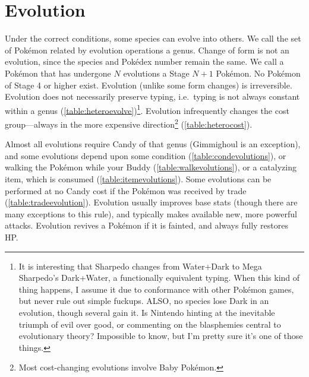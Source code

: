 \section{Evolution\label{sec:evolution}}
Under the correct conditions, some species can evolve into others.
We call the set of Pokémon related by evolution operations a genus.
Change of form is not an evolution, since the species and Pokédex number remain the same.
We call a Pokémon that has undergone $N$ evolutions a Stage $N+1$ Pokémon.
No Pokémon of Stage 4 or higher exist.
Evolution (unlike some form changes) is irreversible.
Evolution does not necessarily preserve typing, i.e.\ typing is not always constant within a genus (\autoref{table:heteroevolve})\footnote{It is interesting
  that Sharpedo changes from Water+Dark to Mega Sharpedo's Dark+Water,
  a functionally equivalent typing. When this kind of thing happens,
  I assume it due to conformance with other Pokémon games, but never
  rule out simple fuckups. ALSO, no species lose Dark in an evolution,
  though several gain it. Is Nintendo hinting at the inevitable triumph of
  evil over good, or commenting on the blasphemies central to evolutionary theory?
  Impossible to know, but I'm pretty sure it's one of those things.}.
Evolution infrequently changes the cost group---always in the more expensive direction\footnote{Most
  cost-changing evolutions involve Baby Pokémon.} (\autoref{table:heterocost}).

Almost all evolutions require Candy of that genus (Gimmighoul is an exception),
  and some evolutions depend upon some condition (\autoref{table:condevolutions}),
  or walking the Pokémon while your Buddy (\autoref{table:walkevolutions}),
  or a catalyzing item, which is consumed (\autoref{table:itemevolutions}).
Some evolutions can be performed at no Candy cost if the Pokémon was received by trade
 (\autoref{table:tradeevolution}).
Evolution usually improves base stats (though there are many exceptions to this rule),
  and typically makes available new, more powerful attacks.
Evolution revives a Pokémon if it is fainted, and always fully restores HP\@.

